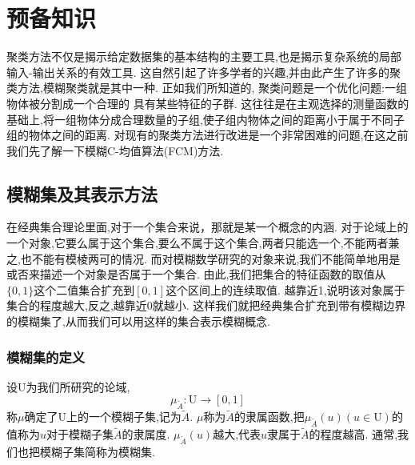 \chapter[预备知识]{预备知识}
聚类方法不仅是揭示给定数据集的基本结构的主要工具,也是揭示复杂系统的局部输入-输出关系的有效工具.
这自然引起了许多学者的兴趣,并由此产生了许多的聚类方法,模糊聚类就是其中一种.
正如我们所知道的, 聚类问题是一个优化问题:一组物体被分割成一个合理的 具有某些特征的子群.
这往往是在主观选择的测量函数的基础上,将一组物体分成合理数量的子组,使子组内物体之间的距离小于属于不同子组的物体之间的距离.
对现有的聚类方法进行改进是一个非常困难的问题,在这之前我们先了解一下模糊C-均值算法(FCM)方法.
\section{模糊集及其表示方法}
\par
在经典集合理论里面,对于一个集合来说，那就是某一个概念的内涵.
对于论域上的一个对象,它要么属于这个集合,要么不属于这个集合,两者只能选一个,不能两者兼之,也不能有模棱两可的情况.
而对模糊数学研究的对象来说,我们不能简单地用是或否来描述一个对象是否属于一个集合.
由此,我们把集合的特征函数的取值从$\{0,1\}$这个二值集合扩充到$[0,1]$这个区间上的连续取值.
越靠近1,说明该对象属于集合的程度越大,反之,越靠近0就越小.
这样我们就把经典集合扩充到带有模糊边界的模糊集了,从而我们可以用这样的集合表示模糊概念.
\subsection{模糊集的定义}
\begin{definition}
    设$\mathrm{U}$为我们所研究的论域,
    \[
        \mu_{\tilde{A}}: \mathrm{U} \longrightarrow[0,1]
    \]
    称$\mu$确定了$\mathrm{U}$上的一个模糊子集,记为$\tilde{A}$.
    $\mu$称为$\tilde{A}$的隶属函数,把$\mu_{\tilde{A}}(u)(u \in \mathrm{U})$的值称为$u$对于模糊子集$\tilde{A}$的隶属度.
    $\mu_{\tilde{A}}(u)$越大,代表$u$隶属于$\tilde{A}$的程度越高.
    通常,我们也把模糊子集简称为模糊集.
\end{definition}
